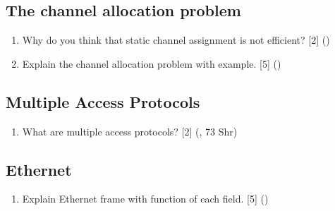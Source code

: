 \documentclass[12pt]{article}
\begin{document}
	\subsection{The channel allocation problem}
		\begin{enumerate}[noitemsep, topsep=0pt]
			\item Why do you think that static channel assignment is not efficient? \hfill [2] () 
			\item Explain the channel allocation problem with example. \hfill[5] ()
		\end{enumerate}

	\subsection{Multiple Access Protocols}
		\begin{enumerate}[noitemsep, topsep=0pt]
			\item What are multiple access protocols? \hfill [2] (, 73 Shr)
		\end{enumerate}

	\subsection{Ethernet}
		\begin{enumerate}
			\item Explain Ethernet frame with function of each field. \hfill [5] ()
		\end{enumerate}
\end{document}
